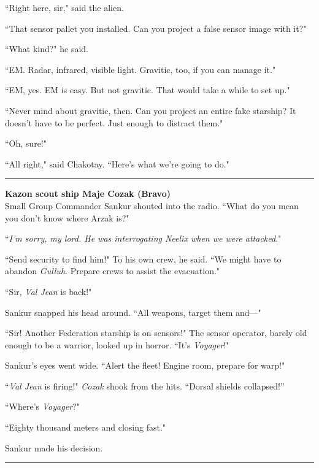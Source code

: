 \documentclass[twoside,letterpaper,12pt]{memoir}
\begin{document}
``Right here, sir," said the alien.

``That sensor pallet you installed. Can you project a false sensor image with it?"

``What kind?" he said.

``EM. Radar, infrared, visible light. Gravitic, too, if you can manage it."

``EM, yes. EM is easy. But not gravitic. That would take a while to set up."

``Never mind about gravitic, then. Can you project an entire fake starship? It doesn't have to be perfect. Just enough to distract them."

``Oh, sure!"

``All right," said Chakotay. ``Here's what we're going to do."

\begin{center}\rule{3cm}{0.4 pt}\end{center}

\noindent\textbf{Kazon scout ship Maje Cozak (Bravo)}\\

Small Group Commander Sankur shouted into the radio. ``What do you mean you don't know where Arzak is?"

``\textit{I'm sorry, my lord. He was interrogating Neelix when we were attacked}."

``Send security to find him!" To his own crew, he said. ``We might have to abandon \textit{Gulluh}. Prepare crews to assist the evacuation."

``Sir, \textit{Val Jean} is back!"

Sankur snapped his head around. ``All weapons, target them and---"

``Sir! Another Federation starship is on sensors!" The sensor operator, barely old enough to be a warrior, looked up in horror. ``It's \textit{Voyager}!"

Sankur's eyes went wide. ``Alert the fleet! Engine room, prepare for warp!"

``\textit{Val Jean} is firing!" \textit{Cozak} shook from the hits. ``Dorsal shields collapsed!”

``Where's \textit{Voyager}?"

``Eighty thousand meters and closing fast."

Sankur made his decision.

\begin{center}\rule{3cm}{0.4 pt}\end{center}
\end{document}

